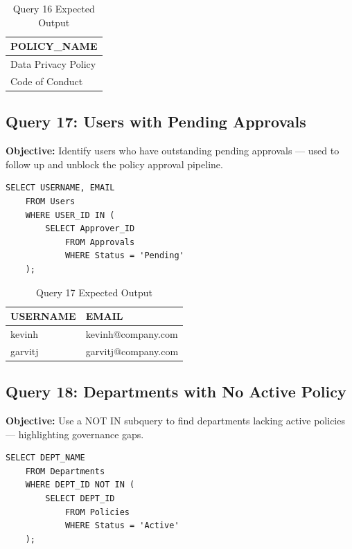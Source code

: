 \documentclass[conference]{IEEEtran}
\begin{document}
\begin{table}[H]
\centering
\caption{Query 16 Expected Output}
\begin{tabular}{|l|}
\hline
\textbf{POLICY\_NAME} \\
\hline
Data Privacy Policy \\
Code of Conduct     \\
\hline
\end{tabular}
\end{table}

\subsection{Query 17: Users with Pending Approvals}

\textbf{Objective:} Identify users who have outstanding pending approvals — used to follow up and unblock the policy approval pipeline.

\begin{lstlisting}[style=sqlstyle, caption={Query 17: Pending Approvers (Subquery)}]
SELECT USERNAME, EMAIL
    FROM Users
    WHERE USER_ID IN (
        SELECT Approver_ID
            FROM Approvals
            WHERE Status = 'Pending'
    );
\end{lstlisting}

\begin{table}[H]
\centering
\caption{Query 17 Expected Output}
\begin{tabular}{|l|l|}
\hline
\textbf{USERNAME} & \textbf{EMAIL} \\
\hline
kevinh  & kevinh@company.com  \\
garvitj & garvitj@company.com \\
\hline
\end{tabular}
\end{table}

\subsection{Query 18: Departments with No Active Policy}

\textbf{Objective:} Use a NOT IN subquery to find departments lacking active policies — highlighting governance gaps.

\begin{lstlisting}[style=sqlstyle, caption={Query 18: Governance Gaps (NOT IN Subquery)}]
SELECT DEPT_NAME
    FROM Departments
    WHERE DEPT_ID NOT IN (
        SELECT DEPT_ID
            FROM Policies
            WHERE Status = 'Active'
    );
\end{lstlisting}
\end{document}
